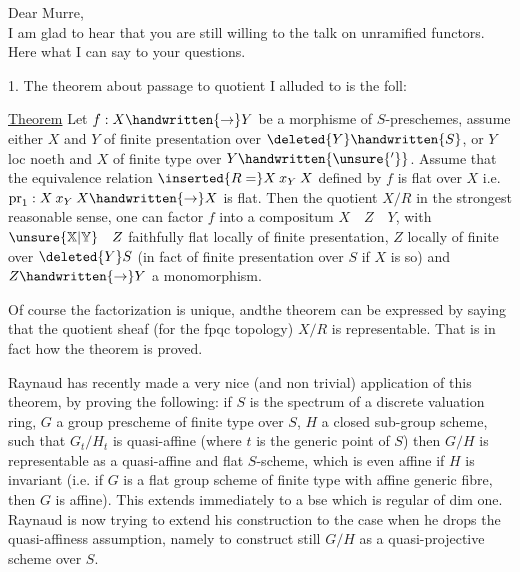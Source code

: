 Dear Murre,\\

I am glad to hear that you are still willing to  the talk on unramified functors. Here what I can say to your questions.

1. The theorem about passage to quotient I alluded to is the foll:

\uline{Theorem} Let $f:X\handwritten{\to}Y$ be a morphisme of $S$-preschemes, assume either $X$ and $Y$  of finite presentation over $\deleted{Y}\handwritten{S}$, or $Y$ loc noeth and $X$  of finite type over $Y\handwritten{\unsure{'}}$. Assume that the equivalence relation $\inserted{R=}X\mathbin{x}_{Y}X$ defined by $f$ is flat over $X$ i.e. $\mathrm{pr}_{1}:X\mathbin{x}_{Y}X\handwritten{\to}X$ is flat. Then the quotient $X/R$  in the strongest reasonable sense,  one can factor $f$ into a compositum $X\quad Z\quad Y$, with $\unsure{\mathbb{X}|\mathbb{Y}}\quad Z$ faithfully flat locally of finite presentation, $Z$ locally of finite  over $\deleted{Y}S$ (in fact of finite presentation over $S$ if $X$ is so) and $Z\handwritten{\to}Y$ a monomorphism.

Of course the factorization is unique, andthe theorem can be expressed by saying that the quotient sheaf (for the fpqc topology) $X/R$ is representable. That is in fact how the theorem is proved.

Raynaud has recently made a very nice (and non trivial) application of this theorem, by proving the following: if $S$ is the spectrum of a discrete valuation ring, $G$ a group prescheme of finite type over $S$, $H$ a closed  sub-group scheme, such that $G_{t}/H_{t}$ is  quasi-affine (where $t$ is the generic point of $S$) then $G/H$ is representable as a quasi-affine and flat $S$-scheme, which is even affine if $H$ is invariant (i.e. if $G$ is a flat group scheme of finite type with affine generic fibre, then $G$ is affine). This extends immediately to a bse which is regular of dim one. Raynaud is now trying to extend his construction to the case when he drops the quasi-affiness assumption, namely to construct still $G/H$
as a quasi-projective scheme over $S$.

